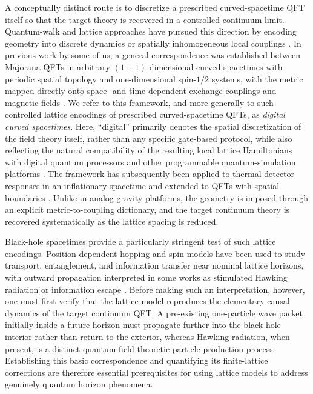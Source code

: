 \documentclass[reprint,amsmath,amssymb,aps,prb,floatfix,showkeys,superscriptaddress]{revtex4-2}
\begin{document}
A conceptually distinct route is to discretize a prescribed curved-spacetime QFT itself so that the target theory is recovered in a controlled continuum limit. Quantum-walk and lattice approaches have pursued this direction by encoding geometry into discrete dynamics or spatially inhomogeneous local couplings \cite{DiMolfetta2013,Yang2020,LewisVidal2020}. In previous work by some of us, a general correspondence was established between Majorana QFTs in arbitrary $(1+1)$-dimensional curved spacetimes with periodic spatial topology and one-dimensional spin-$1/2$ systems, with the metric mapped directly onto space- and time-dependent exchange couplings and magnetic fields \cite{Kinoshita2025}. We refer to this framework, and more generally to such controlled lattice encodings of prescribed curved-spacetime QFTs, as \emph{digital curved spacetimes}. Here, ``digital'' primarily denotes the spatial discretization of the field theory itself, rather than any specific gate-based protocol, while also reflecting the natural compatibility of the resulting local lattice Hamiltonians with digital quantum processors and other programmable quantum-simulation platforms \cite{Altman2021}. The framework has subsequently been applied to thermal detector responses in an inflationary spacetime and extended to QFTs with spatial boundaries \cite{KinoshitaInflation2025,KinoshitaBoundary2026}. Unlike in analog-gravity platforms, the geometry is imposed through an explicit metric-to-coupling dictionary, and the target continuum theory is recovered systematically as the lattice spacing is reduced.

Black-hole spacetimes provide a particularly stringent test of such lattice encodings. Position-dependent hopping and spin models have been used to study transport, entanglement, and information transfer near nominal lattice horizons, with outward propagation interpreted in some works as stimulated Hawking radiation or information escape \cite{Yang2020,Shi2023,Benhemou2023,Liu2026}. Before making such an interpretation, however, one must first verify that the lattice model reproduces the elementary causal dynamics of the target continuum QFT. A pre-existing one-particle wave packet initially inside a future horizon must propagate further into the black-hole interior rather than return to the exterior, whereas Hawking radiation, when present, is a distinct quantum-field-theoretic particle-production process. Establishing this basic correspondence and quantifying its finite-lattice corrections are therefore essential prerequisites for using lattice models to address genuinely quantum horizon phenomena.
\end{document}
